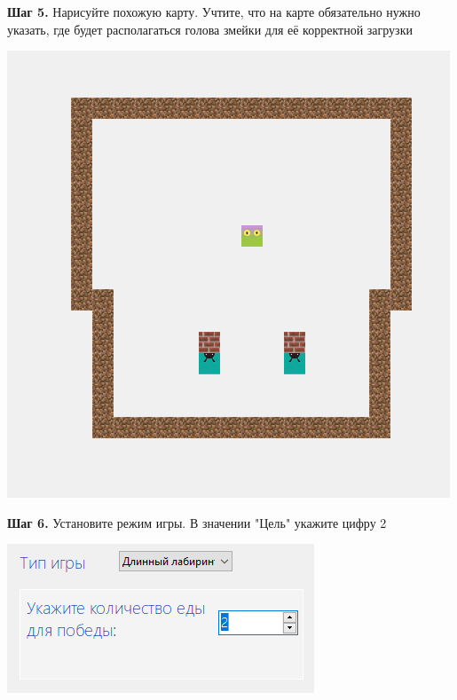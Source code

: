 \documentclass[a4paper,14pt]{extarticle}
\begin{document}
\textbf{Шаг 5.} Нарисуйте похожую карту. Учтите, что на карте обязательно нужно указать, где будет располагаться голова змейки для её корректной загрузки
\begin{center}
\includegraphics[scale=.9]{img16}
\end{center}

\textbf{Шаг 6.} Установите режим игры. В значении "Цель" укажите цифру 2
\begin{center}
\includegraphics[scale=.9]{img17}
\end{center}
\end{document}
